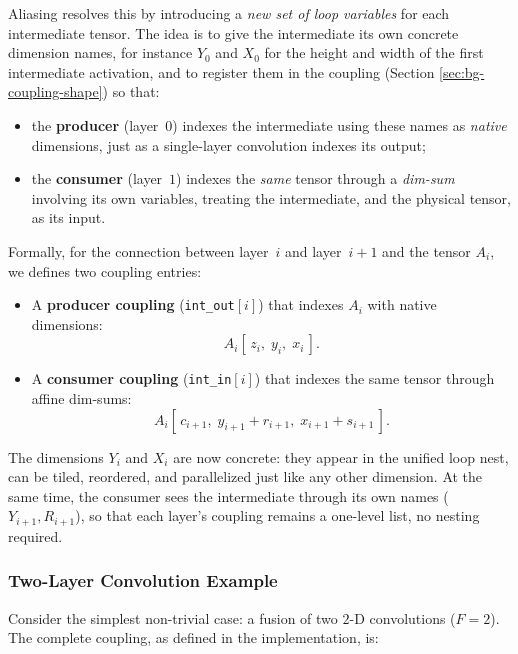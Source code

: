 Aliasing resolves this by introducing a \emph{new set of loop
variables} for each intermediate tensor.
The idea is to give the intermediate its own concrete dimension names,
for instance $Y_0$ and $X_0$ for the height and width of the first
intermediate activation, and to register them in the coupling  (Section \ref{sec:bg-coupling-shape}) so
that:
%
\begin{itemize}
  \item the \textbf{producer} (layer~$0$) indexes the intermediate
        using these names as \emph{native} dimensions, just as a
        single-layer convolution indexes its output;
  \item the \textbf{consumer} (layer~$1$) indexes the \emph{same}
        tensor through a \emph{dim-sum} involving its own variables,
        treating the intermediate, and the physical tensor, as its input.
\end{itemize}
%
Formally, for the connection between layer~$i$ and layer~$i\!+\!1$
and the tensor $A_i$, we defines two coupling entries:
%
\begin{itemize}
  \item A \textbf{producer coupling} (\texttt{int\_out}$[i]$) that
        indexes $A_i$ with native dimensions:
        \[
          A_i[\,z_i,\; y_i,\; x_i\,].
        \]
  \item A \textbf{consumer coupling} (\texttt{int\_in}$[i]$) that
        indexes the same tensor through affine dim-sums:
        \[
          A_i[\,c_{i+1},\; y_{i+1}\!+\!r_{i+1},\;
                           x_{i+1}\!+\!s_{i+1}\,].
        \]
\end{itemize}
%
The dimensions $Y_i$ and $X_i$ are now concrete: they appear in the
unified loop nest, can be tiled, reordered, and parallelized just
like any other dimension.
At the same time, the consumer sees the intermediate through its own
names ($Y_{i+1}, R_{i+1}$), so that each layer's coupling
remains a one-level list, no nesting required.


\subsubsection{Two-Layer Convolution Example}
\label{sec:ps-alias-example}

Consider the simplest non-trivial case: a fusion of two
$2$-D convolutions ($F\!=\!2$).
The complete coupling, as defined in the implementation, is:

